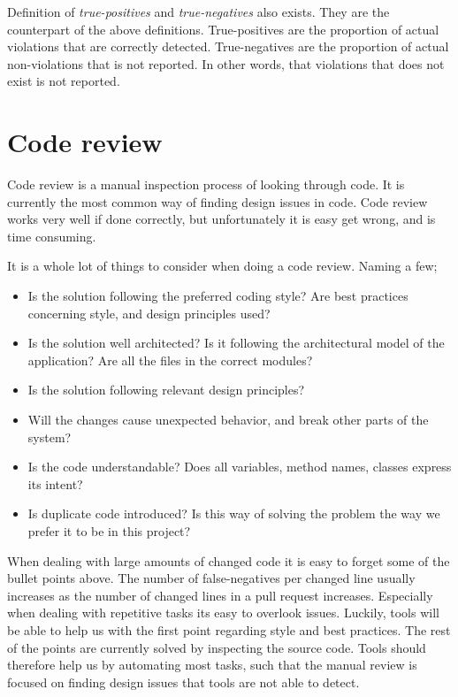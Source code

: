 \documentclass{report}
\begin{document}
Definition of \textit{true-positives} and \textit{true-negatives} also exists. They are the counterpart of the above definitions. True-positives are the proportion of actual violations that are correctly detected. True-negatives are the proportion of actual non-violations that is not reported. In other words, that violations that does not exist is not reported. 



\section{Code review}
\label{code-review}
Code review is a manual inspection process of looking through code. It is currently the most common way of finding design issues in code. Code review works very well if done correctly, but unfortunately it is easy get wrong, and is time consuming. 

It is a whole lot of things to consider when doing a code review. Naming a few;

\begin{itemize}
    \item Is the solution following the preferred coding style? Are best practices concerning style, and design principles used?
    \item Is the solution well architected? Is it following the architectural model of the application? Are all the files in the correct modules?
    \item Is the solution following relevant design principles?
    \item Will the changes cause unexpected behavior, and break other parts of the system? 
    \item Is the code understandable? Does all variables, method names, classes express its intent?
    \item Is duplicate code introduced? Is this way of solving the problem the way we prefer it to be in this project?
\end{itemize}

When dealing with large amounts of changed code it is easy to forget some of the bullet points above. The number of false-negatives per changed line usually increases as the number of changed lines in a pull request increases. Especially when dealing with repetitive tasks its easy to overlook issues. Luckily, tools will be able to help us with the first point regarding style and best practices. The rest of the points are currently solved by inspecting the source code. Tools should therefore help us by automating most tasks, such that the manual review is focused on finding design issues that tools are not able to detect. 
\end{document}
